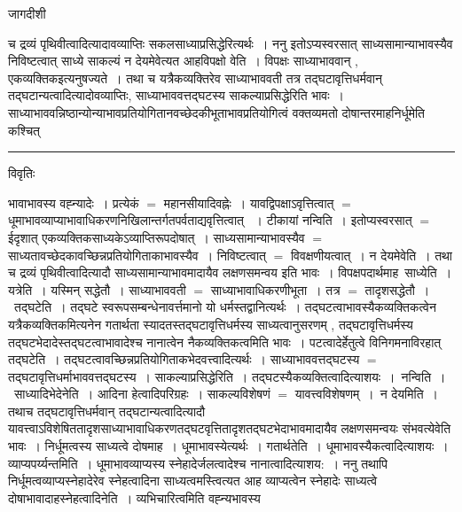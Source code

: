 \documentclass[10pt, openany]{book}
\begin{document}
{\newpage
\begin{center} जागदीशी \end{center}
{\la च द्रव्यं पृथिवीत्वादित्यादावव्याप्तिः सकलसाध्याप्रसिद्धेरित्यर्थः~। ननु इतोऽप्यस्वरसात् साध्यसामान्याभावस्यैव निविष्टत्वात् साध्ये साकल्यं न देयमेवेत्यत आह\textendash विपक्षो वेति~। विपक्षः साध्याभाववान् , एकव्यक्तिकइत्यनुषज्यते~। तथा च यत्रैकव्यक्तिरेव साध्याभाववती तत्र तद्घटावृत्तिधर्मवान् तद्घटान्यत्वादित्यादोवव्याप्तिः, साध्याभाववत्तद्घटस्य साकल्याप्रसिद्धेरिति भावः~। साध्याभाववन्निष्ठान्योन्याभावप्रतियोगितानवच्छेदकीभूताभावप्रतियोगित्वं वक्तव्यमतो दोषान्तरमाह\textemdash  निर्धूमेति कश्चित्}\\
\hrule
\begin{center}     विवृतिः \end{center}
भावाभावस्य वह्न्यादेः~। प्रत्येकं $=$ महानसीयादिवह्नेः~। यावद्विपक्षाऽवृत्तित्वात् $=$ धूमाभावव्याप्याभावाधिकरणनिखिलान्तर्गतपर्वताद्यवृत्तित्वात् ~। टीकायां {\la नन्विति~।} इतोप्यस्वरसात् $=$ ईदृशात् एकव्यक्तिकसाध्यकेऽव्याप्तिरूपदोषात्~। साध्यसामान्याभावस्यैव  $=$ साध्यतावच्छेदकावच्छिन्नप्रतियोगिताकाभावस्यैव~। निविष्टत्वात् $=$  विवक्षणीयत्वात्~। न देयमेवेति~। तथा च द्रव्यं पृथिवीत्वादित्यादौ साध्यसामान्याभावमादायैव लक्षणसमन्वय इति भावः~। विपक्षपदार्थमाह\textemdash\ {\la साध्येति~। यत्रेति~।} यस्मिन् सद्धेतौ~। साध्याभाववती $=$ साध्याभावाधिकरणीभूता~। तत्र $=$ तादृशसद्धेतौ~।~{\la तद्घटेति~।} तद्घटे स्वरूपसम्बन्धेनावर्त्तमानो यो
धर्मस्तद्वानित्यर्थः~। तद्घटत्वाभावस्यैकव्यक्तिकत्वेन यत्रैकव्यक्तिकमित्यनेन गतार्थता स्यादतस्तद्घटावृत्तिधर्मस्य साध्यत्वानुसरणम् , तद्घटावृत्तिधर्मस्य
तद्घटभेदादेस्तद्घटत्वाभावादेश्च नानात्वेन नैकव्यक्तिकत्वमिति भावः~। पटत्वादेर्हेतुत्वे विनिगमनाविरहात् {\la तद्घटेति~।} तद्घटत्वावच्छिन्नप्रतियोगिताकभेदवत्त्वादित्यर्थः~। साध्याभाववत्तद्घटस्य $=$ तद्घटावृत्तिधर्माभाववत्तद्घटस्य~। {\la साकल्याप्रसिद्धेरिति~।}
तद्घटस्यैकव्यक्तित्वादित्याशयः~।~{\la नन्विति~।~साध्यादिभेदेनेति~।} आदिना हेत्वादिपरिग्रहः~। साकल्यविशेषणं $=$ यावत्त्वविशेषणम्~।~{\la न देयमिति~।} तथाच
तद्घटावृत्तिधर्मवान् तद्घटान्यत्वादित्यादौ यावत्त्वाऽविशेषिततादृशसाध्याभावाधिकरणतद्घटवृत्तितादृशतद्घटभेदाभावमादायैव लक्षणसमन्वयः संभवत्येवेति भावः~। निर्धूमत्वस्य साध्यत्वे दोषमाह~। धूमाभावस्येत्यर्थः~। {\la गतार्थतेति~।} धूमाभावस्यैकत्वादित्याशयः~। व्याप्यपर्य्यन्तमिति~। धूमाभावव्याप्यस्य
स्नेहादेर्जलत्वादेश्च नानात्वादित्याशय:~। ननु तथापि निर्धूमत्वव्याप्यस्नेहादेरेव स्नेहत्वादिना साध्यत्वमस्त्वित्यत आह व्याप्यत्वेन
स्नेहादेः साध्यत्वे दोषाभावादाह\textendash स्नेहत्वादिनेति~। व्यभिचारित्वमिति वह्न्यभावस्य
}
\end{document}
